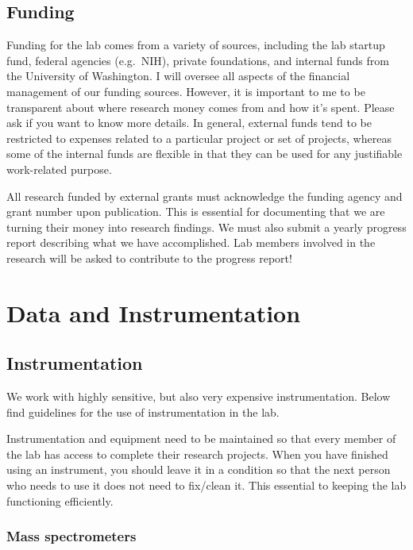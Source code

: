 \documentclass[
]{book}
\begin{document}
\hypertarget{funding}{%
\section{Funding}\label{funding}}

Funding for the lab comes from a variety of sources, including the lab startup fund, federal agencies (e.g.~NIH), private foundations, and internal funds from the University of Washington. I will oversee all aspects of the financial management of our funding sources. However, it is important to me to be transparent about where research money comes from and how it's spent. Please ask if you want to know more details. In general, external funds tend to be restricted to expenses related to a particular project or set of projects, whereas some of the internal funds are flexible in that they can be used for any justifiable work-related purpose.

All research funded by external grants must acknowledge the funding agency and grant number upon publication. This is essential for documenting that we are turning their money into research findings. We must also submit a yearly progress report describing what we have accomplished. Lab members involved in the research will be asked to contribute to the progress report!

\hypertarget{data}{%
\chapter{Data and Instrumentation}\label{data}}

\hypertarget{instrumentation}{%
\section{Instrumentation}\label{instrumentation}}

We work with highly sensitive, but also very expensive instrumentation. Below find guidelines for the use of instrumentation in the lab.

Instrumentation and equipment need to be maintained so that every member of the lab has access to complete their research projects. When you have finished using an instrument, you should leave it in a condition so that the next person who needs to use it does not need to fix/clean it. This essential to keeping the lab functioning efficiently.

\hypertarget{mass-spectrometers}{%
\subsection{Mass spectrometers}\label{mass-spectrometers}}
\end{document}
